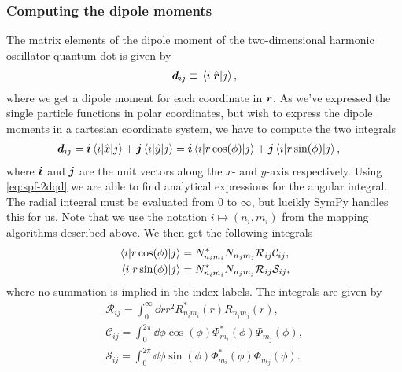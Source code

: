         \subsubsection{Computing the dipole moments}
            The matrix elements of the dipole moment of the two-dimensional
            harmonic oscillator quantum dot is given by
            \begin{align}
                \boldsymbol{d}_{ij}
                \equiv \mel{i}{\hat{\boldsymbol{r}}}{j},
            \end{align}
            where we get a dipole moment for each coordinate in $\boldsymbol{r}$. As
            we've expressed the single particle functions in polar coordinates,
            but wish to express the dipole moments in a cartesian coordinate
            system, we have to compute the two integrals
            \begin{align}
                \vf{d}_{ij}
                &= \vf{i}\mel{i}{\position}{j}
                + \vf{j}\mel{i}{\position[y]}{j}
                = \vf{i}\mel{i}{r \cos(\phi)}{j}
                + \vf{j}\mel{i}{r \sin(\phi)}{j},
                \label{eq:dipole_elements}
            \end{align}
            where $\boldsymbol{i}$ and $\boldsymbol{j}$ are the unit vectors along the $x$- and
            $y$-axis respectively.  Using \autoref{eq:spf-2dqd} we are able to
            find analytical expressions for the angular integral. The radial
            integral must be evaluated from $0$ to $\infty$, but lucikly SymPy
            \cite{sympy} handles this for us. Note that we use the notation $i
            \mapsto (n_i, m_i)$ from the mapping algorithms described above. We
            then get the following integrals
            \begin{align}
                \mel{i}{r \cos(\phi)}{j}
                &= N^{*}_{n_i m_i} N_{n_j m_j}
                \mathcal{R}_{ij}
                \mathcal{C}_{ij},
                \\
                \mel{i}{r \sin(\phi)}{j}
                &= N^{*}_{n_i m_i} N_{n_j m_j}
                \mathcal{R}_{ij}
                \mathcal{S}_{ij},
            \end{align}
            where no summation is implied in the index labels.
            The integrals are given by
            \begin{gather}
                \mathcal{R}_{ij}
                =
                \int_{0}^{\infty} \dd r r^2
                R_{n_i m_i}^{*}(r) R_{n_j m_j}(r),
                \label{eq:radial-integral-tdho}
                \\
                \mathcal{C}_{ij}
                =
                \int_{0}^{2\pi}
                \dd \phi
                \cos(\phi)
                \Phi_{m_i}^{*}(\phi)
                \Phi_{m_j}(\phi),
                \label{eq:cos-integral-tdho}
                \\
                \mathcal{S}_{ij}
                =
                \int_{0}^{2\pi}
                \dd \phi
                \sin(\phi)
                \Phi_{m_i}^{*}(\phi)
                \Phi_{m_j}(\phi).
                \label{eq:sin-integral-tdho}
            \end{gather}
